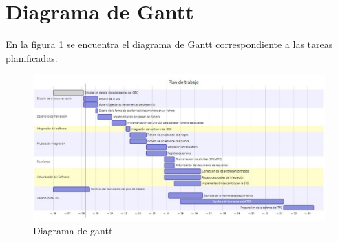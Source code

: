 
\section{Diagrama de Gantt}
En la figura 1 se encuentra el diagrama de Gantt
correspondiente a las tareas planificadas.
\begin{figure}[h]
  \label{fig:diagrama}
  \hspace*{-2cm}%
  \includegraphics[scale=0.65]{fig/plan.JPG}
  \hspace*{-3cm}%
  \caption{Diagrama de gantt}
\end{figure}
